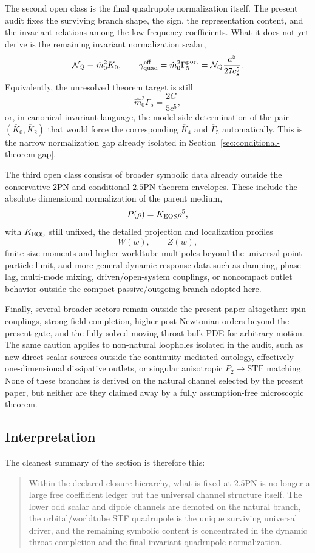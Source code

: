 \documentclass[11pt]{article}
\begin{document}
The second open class is the final quadrupole normalization itself.  The present
audit fixes the surviving branch shape, the sign, the representation content, and
the invariant relations among the low-frequency coefficients.  What it does not
yet derive is the remaining invariant normalization scalar,
\[
\mathcal N_Q\equiv \hat m_0^2 K_0,
\qquad
\gamma_{\rm quad}^{\rm eff}
=
\hat m_0^2\Gamma_5^{\rm port}
=
\mathcal N_Q\frac{a^5}{27c_s^5}.
\]
Equivalently, the unresolved theorem target is still
\[
\hat m_0^2\Gamma_5=\frac{2G}{5c^5},
\]
or, in canonical invariant language, the model-side determination of the pair
$(\overline K_0,\overline K_2)$ that would force the corresponding
$\overline K_4$ and $\overline\Gamma_5$ automatically.  This is the narrow
normalization gap already isolated in Section~\ref{sec:conditional-theorem-gap}.

The third open class consists of broader symbolic data already outside the
conservative $2$PN and conditional $2.5$PN theorem envelopes.  These include the
absolute dimensional normalization of the parent medium,
\[
P(\rho)=K_{\rm EOS}\rho^5,
\]
with $K_{\rm EOS}$ still unfixed, the detailed projection and localization
profiles
\[
W(w),\qquad Z(w),
\]
finite-size moments and higher worldtube multipoles beyond the universal
point-particle limit, and more general dynamic response data such as damping,
phase lag, multi-mode mixing, driven/open-system couplings, or noncompact outlet
behavior outside the compact passive/outgoing branch adopted here.

Finally, several broader sectors remain outside the present paper altogether:
spin couplings, strong-field completion, higher post-Newtonian orders beyond the
present gate, and the fully solved moving-throat bulk PDE for arbitrary motion.
The same caution applies to non-natural loopholes isolated in the audit, such as
new direct scalar sources outside the continuity-mediated ontology, effectively
one-dimensional dissipative outlets, or singular anisotropic $P_2\to\mathrm{STF}$
matching.  None of these branches is derived on the natural channel selected by
the present paper, but neither are they claimed away by a fully assumption-free
microscopic theorem.

\subsection{Interpretation}
\label{sec:fixed-vs-symbolic-interpretation}

The cleanest summary of the section is therefore this:
\begin{quote}
Within the declared closure hierarchy, what is fixed at $2.5$PN is no longer a
large free coefficient ledger but the universal channel structure itself.  The
lower odd scalar and dipole channels are demoted on the natural branch, the
orbital/worldtube STF quadrupole is the unique surviving universal driver, and
the remaining symbolic content is concentrated in the dynamic throat completion
and the final invariant quadrupole normalization.
\end{quote}
\end{document}
